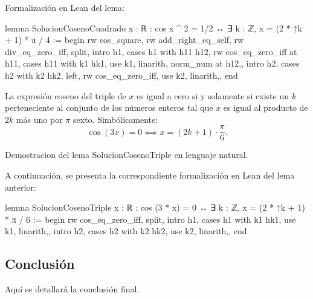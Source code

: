 Formalización en Lean del lema:
\begin{leancode}
lemma SolucionCosenoCuadrado {x : ℝ} : cos x ^ 2 = 1/2 ↔
∃ k : ℤ, x = (2 * ↑k + 1) * π / 4 :=
begin
  rw cos_square,
  rw add_right_eq_self,
  rw div_eq_zero_iff,
  split,
  {intro h1,
  cases h1 with h11 h12,
  rw cos_eq_zero_iff at h11,
  cases h11 with k1 hk1,
  use k1,
  linarith,
  norm_num at h12,},
  {intro h2, 
  cases h2 with k2 hk2,
  left,
  rw cos_eq_zero_iff,
  use k2,
  linarith,},
end
\end{leancode}


\begin{lema}[SolucionCosenoTriple]La expresión coseno del
  triple de \(x\) es igual a cero si y solamente si
  existe un \(k\) perteneciente al conjunto de los números
  enteros tal que \(x\) es igual al producto de \(2k\) más
  uno por \(π\) sexto. Simbólicamente:
  \begin{equation}
    \cos(3x)=0 ⟺ x=(2k+1)⋅\frac{π}{6}.
  \end{equation}
\end{lema}
\begin{demostracion}
  Demostracion del lema SolucionCosenoTriple en lenguaje
  natural.
\end{demostracion}

A continuación, se presenta la correspondiente formalización
en Lean del lema anterior:
\begin{leancode}
lemma SolucionCosenoTriple {x : ℝ} : cos (3 * x) = 0 ↔ 
∃ k : ℤ, x = (2 * ↑k + 1) * π / 6 :=
begin
  rw cos_eq_zero_iff,
  split,
  {intro h1,
  cases h1 with k1 hk1,
  use k1,
  linarith,},
  {intro h2,
  cases h2 with k2 hk2,
  use k2,
  linarith,},
end
\end{leancode}


\subsection{Conclusión}
Aquí se detallará la conclusión final.